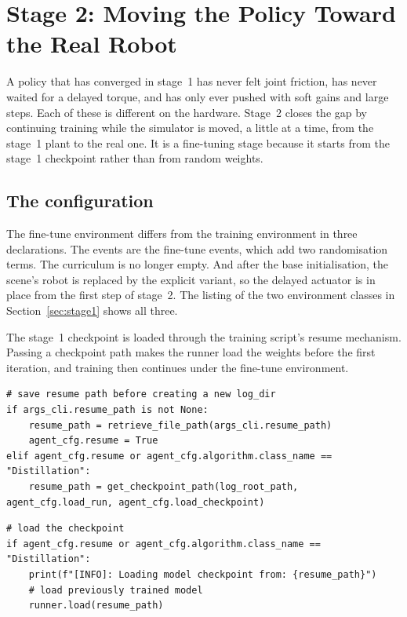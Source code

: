 \section{Stage 2: Moving the Policy Toward the Real Robot}
\label{sec:stage2}

A policy that has converged in stage~1 has never felt joint friction, has never waited for a delayed torque, and has only ever pushed with soft gains and large steps. Each of these is different on the hardware. Stage~2 closes the gap by continuing training while the simulator is moved, a little at a time, from the stage~1 plant to the real one. It is a fine-tuning stage because it starts from the stage~1 checkpoint rather than from random weights.

\subsection{The configuration}

The fine-tune environment differs from the training environment in three declarations. The events are the fine-tune events, which add two randomisation terms. The curriculum is no longer empty. And after the base initialisation, the scene's robot is replaced by the explicit variant, so the delayed actuator is in place from the first step of stage~2. The listing of the two environment classes in Section~\ref{sec:stage1} shows all three.

The stage~1 checkpoint is loaded through the training script's resume mechanism. Passing a checkpoint path makes the runner load the weights before the first iteration, and training then continues under the fine-tune environment.

\begin{snippetbox}[11]
\begin{lstlisting}[firstnumber=179]
# save resume path before creating a new log_dir
if args_cli.resume_path is not None:
    resume_path = retrieve_file_path(args_cli.resume_path)
    agent_cfg.resume = True
elif agent_cfg.resume or agent_cfg.algorithm.class_name == "Distillation":
    resume_path = get_checkpoint_path(log_root_path, agent_cfg.load_run, agent_cfg.load_checkpoint)
\end{lstlisting}
\snippetelide
\begin{lstlisting}[firstnumber=210]
# load the checkpoint
if agent_cfg.resume or agent_cfg.algorithm.class_name == "Distillation":
    print(f"[INFO]: Loading model checkpoint from: {resume_path}")
    # load previously trained model
    runner.load(resume_path)
\end{lstlisting}
\end{snippetbox}

